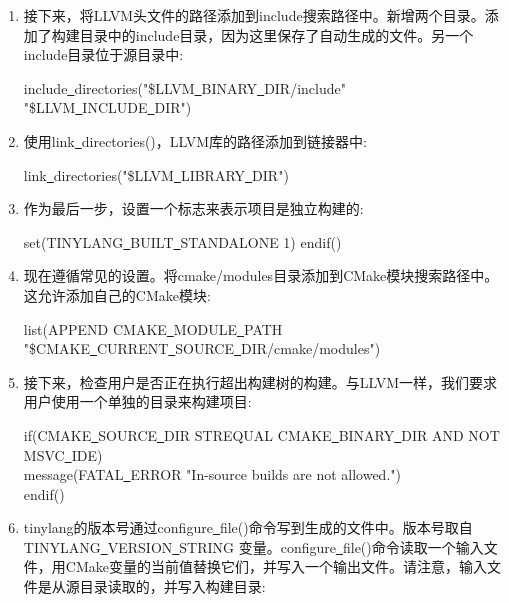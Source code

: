 \begin{enumerate}
\begin{tcolorbox}[colback=white,colframe=black]
 	\end{tcolorbox}
 	\item 接下来，将LLVM头文件的路径添加到include搜索路径中。新增两个目录。添加了构建目录中的include目录，因为这里保存了自动生成的文件。另一个include目录位于源目录中:
 	\begin{tcolorbox}[colback=white,colframe=black]
 		include\underline{~}directories("\${LLVM\underline{~}BINARY\underline{~}DIR}/include" \\
 		\hspace*{0.5cm}"\${LLVM\underline{~}INCLUDE\underline{~}DIR}")
 	\end{tcolorbox}
 	\item 使用link\underline{~}directories()，LLVM库的路径添加到链接器中:
 	\begin{tcolorbox}[colback=white,colframe=black]
 		link\underline{~}directories("\${LLVM\underline{~}LIBRARY\underline{~}DIR}")
 	\end{tcolorbox}
 	\item 作为最后一步，设置一个标志来表示项目是独立构建的:
 	\begin{tcolorbox}[colback=white,colframe=black]
 		set(TINYLANG\underline{~}BUILT\underline{~}STANDALONE 1)
      endif()
 	\end{tcolorbox}
 	\item 现在遵循常见的设置。将cmake/modules目录添加到CMake模块搜索路径中。这允许添加自己的CMake模块:
 	\begin{tcolorbox}[colback=white,colframe=black]
      list(APPEND CMAKE\underline{~}MODULE\underline{~}PATH \\
 		\hspace*{0.5cm}"\${CMAKE\underline{~}CURRENT\underline{~}SOURCE\underline{~}DIR}/cmake/modules")
 	\end{tcolorbox}
 	\item 接下来，检查用户是否正在执行超出构建树的构建。与LLVM一样，我们要求用户使用一个单独的目录来构建项目:
 	\begin{tcolorbox}[colback=white,colframe=black]
 		if(CMAKE\underline{~}SOURCE\underline{~}DIR STREQUAL CMAKE\underline{~}BINARY\underline{~}DIR AND NOT MSVC\underline{~}IDE) \\
   		\hspace*{0.5cm}message(FATAL\underline{~}ERROR "In-source builds are not allowed.") \\
 		endif()
 	\end{tcolorbox}
 	\item tinylang的版本号通过configure\underline{~}file()命令写到生成的文件中。版本号取自TINYLANG\underline{~}VER\allowbreak SION\underline{~}STRING 变量。configure\underline{~}file()命令读取一个输入文件，用CMake变量的当前值替换它们，并写入一个输出文件。请注意，输入文件是从源目录读取的，并写入构建目录:

\end{enumerate}
